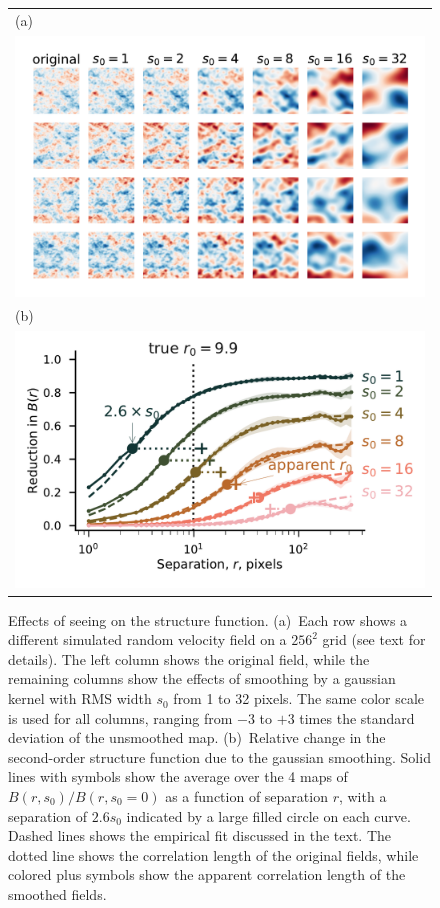 \documentclass[fleqn,usenatbib, useAMS, a4paper]{mnras}
\newcommand\startNEW{\color{NEWcolor}}
\newcommand\stopNEW{\color{black}}
\newcommand\NEW[1]{\startNEW #1\stopNEW\relax}
\begin{document}
\begin{figure}
  \begin{tabular}{@{} l @{}}
    (a)\\
    \includegraphics[width=\linewidth]{Figures/fake-3d-seeing-nonp-ems-fluct-thumbnails_sigE_1}\\
    (b)\\
    \includegraphics[width=\linewidth]{Figures/fake-seeing-nonp-3d-ems-fluc_m4-reduction_sigE_1}
  \end{tabular}
  \caption{Effects of seeing on the structure function.
    (a)~Each row shows a different simulated random velocity field
    on a \(256^2\) grid (see text for details).
    The left column shows the original field,
    while the remaining columns show the effects of smoothing by a gaussian kernel
    with RMS width \(s_0\) from 1 to 32 pixels.
    The same color scale is used for all columns, ranging from \(-3\) to \(+3\) times
    the standard deviation of the unsmoothed map.
    (b)~Relative change in the second-order structure function due to the gaussian smoothing.
    Solid lines with symbols show the average over the 4 maps of
    \(B(r, s_0) / B(r, s_0 = 0)\) as a function of separation \(r\),
    with a separation of \NEW{\(2.6 s_0\)} indicated by a large filled circle on each curve.
    Dashed lines shows the empirical fit discussed in the text.
    The dotted line shows the correlation length of the original fields,
    while colored plus symbols show the apparent correlation length of the smoothed fields.
  }
  \label{fig:seeing-reduction}
\end{figure}
\end{document}
